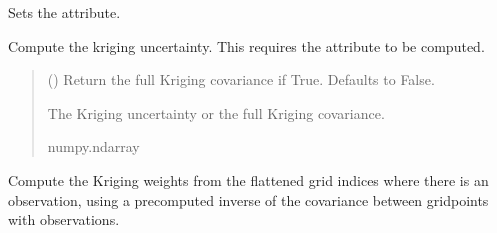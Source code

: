 \documentclass[letterpaper,10pt,english]{sphinxmanual}
\begin{document}
\begin{fulllineitems}
\begin{fulllineitems}
\sphinxAtStartPar
Sets the  attribute.
\begin{quote}\begin{description}
\sphinxAtStartPar
{}

\end{description}\end{quote}

\end{fulllineitems}


\begin{fulllineitems}
\label{\detokenize{kriging:glomar_gridding.kriging.SimpleKriging.get_uncertainty}}
\pysigstartsignatures
\pysiglinewithargsret
{}
{}
{}
\pysigstopsignatures
\sphinxAtStartPar
Compute the kriging uncertainty. This requires the attribute
 to be computed.
\begin{quote}\begin{description}
\sphinxAtStartPar
{} () \textendash{} Return the full Kriging covariance if True. Defaults to False.

\sphinxAtStartPar
{} \textendash{} The Kriging uncertainty or the full Kriging covariance.

\sphinxAtStartPar
numpy.ndarray

\end{description}\end{quote}

\end{fulllineitems}


\begin{fulllineitems}
\label{\detokenize{kriging:glomar_gridding.kriging.SimpleKriging.kriging_weights_from_inverse}}
\pysigstartsignatures
\pysiglinewithargsret
{}
{}
{}
\pysigstopsignatures
\sphinxAtStartPar
Compute the Kriging weights from the flattened grid indices where
there is an observation, using a pre\sphinxhyphen{}computed inverse of the covariance
between grid\sphinxhyphen{}points with observations.


\end{fulllineitems}
\end{fulllineitems}
\end{document}
